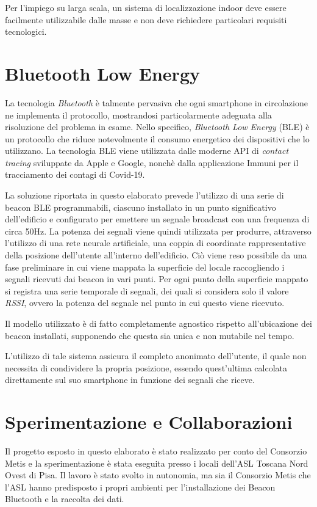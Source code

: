 \documentclass[draft]{standalone}
\begin{document}
Per l'impiego su larga scala, un sistema di localizzazione indoor deve essere
facilmente utilizzabile dalle masse e non deve richiedere particolari requisiti
tecnologici.

\section{Bluetooth Low Energy}
La tecnologia \emph{Bluetooth} è talmente pervasiva che ogni smartphone in
circolazione ne implementa il protocollo, mostrandosi particolarmente adeguata
alla risoluzione del problema in esame. Nello specifico, \emph{Bluetooth Low
  Energy} (BLE) è un protocollo che riduce notevolmente il consumo energetico
dei dispositivi che lo utilizzano. La tecnologia BLE viene utilizzata dalle
moderne API di \emph{contact tracing} sviluppate da Apple e Google, nonchè
dalla applicazione Immuni\cite{immuni} per il tracciamento dei contagi di
Covid-19\cite{apple-google}.

La soluzione riportata in questo elaborato prevede l'utilizzo di una serie di
beacon BLE programmabili, ciascuno installato in un punto significativo
dell'edificio e configurato per emettere un segnale broadcast con una frequenza
di circa 50Hz. La potenza dei segnali viene quindi utilizzata per produrre,
attraverso l'utilizzo di una rete neurale artificiale, una coppia di coordinate
rappresentative della posizione dell'utente all'interno dell'edificio. Ciò
viene reso possibile da una fase preliminare in cui viene mappata la superficie
del locale raccogliendo i segnali ricevuti dai beacon in vari punti. Per ogni
punto della superficie mappato si registra una serie temporale di segnali, dei
quali si considera solo il valore \emph{RSSI}, ovvero la potenza del segnale
nel punto in cui questo viene ricevuto.

Il modello utilizzato è di fatto completamente agnostico rispetto
all'ubicazione dei beacon installati, supponendo che questa sia unica e non
mutabile nel tempo.

L'utilizzo di tale sistema assicura il completo anonimato dell'utente, il quale
non necessita di condividere la propria posizione, essendo quest'ultima
calcolata direttamente sul suo smartphone in funzione dei segnali che riceve.

\section{Sperimentazione e Collaborazioni}
Il progetto esposto in questo elaborato è stato realizzato per conto del
Consorzio Metis e la sperimentazione è stata eseguita presso i locali dell'ASL
Toscana Nord Ovest di Pisa. Il lavoro è stato svolto in autonomia, ma sia il
Consorzio Metis che l'ASL hanno predisposto i propri ambienti per
l'installazione dei Beacon Bluetooth e la raccolta dei dati.
\end{document}
